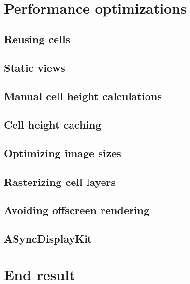 \documentclass[a4paper,12pt]{article}
\begin{document}
\newpage
\section{Performance optimizations}
\subsection{Reusing cells}

\subsection{Static views}

\subsection{Manual cell height calculations}

\subsection{Cell height caching}

\subsection{Optimizing image sizes}

\subsection{Rasterizing cell layers}

\subsection{Avoiding offscreen rendering}

\subsection{ASyncDisplayKit}

\newpage
\section{End result}
\end{document}
